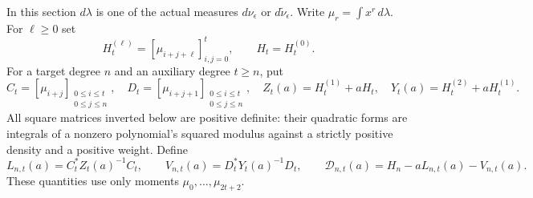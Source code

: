 \documentclass[11pt]{article}
\begin{document}
In this section $d\lambda$ is one of the actual measures
$d\nu_\epsilon$ or $d\widetilde\nu_\epsilon$.  Write
$\mu_r=\int x^r\,d\lambda$.  For $\ell\ge0$ set
\[
 H_t^{(\ell)}=[\mu_{i+j+\ell}]_{i,j=0}^t,
 \qquad H_t=H_t^{(0)}.
\]
For a target degree $n$ and an auxiliary degree $t\ge n$, put
\begin{equation}\label{mmnative:eq:rectangular}
 C_t=[\mu_{i+j}]_{\substack{0\le i\le t\\0\le j\le n}},
 \quad D_t=[\mu_{i+j+1}]_{\substack{0\le i\le t\\0\le j\le n}},
 \quad Z_t(a)=H_t^{(1)}+aH_t,
 \quad Y_t(a)=H_t^{(2)}+aH_t^{(1)}.
\end{equation}
All square matrices inverted below are positive definite: their
quadratic forms are integrals of a nonzero polynomial's squared
modulus against a strictly positive density and a positive weight.
Define
\begin{equation}\label{mmnative:eq:variational}
 L_{n,t}(a)=C_t^*Z_t(a)^{-1}C_t,
 \qquad V_{n,t}(a)=D_t^*Y_t(a)^{-1}D_t,
 \qquad\mathcal D_{n,t}(a)=H_n-aL_{n,t}(a)-V_{n,t}(a).
\end{equation}
These quantities use only moments $\mu_0,\ldots,\mu_{2t+2}$.
\end{document}
